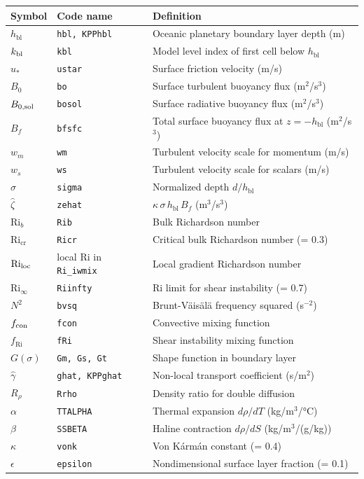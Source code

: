 \documentclass[12pt,letterpaper]{article}
\newcommand{\hbl}{h_{\mathrm{bl}}}
\newcommand{\ustar}{u_*}
\newcommand{\Ri}{\mathrm{Ri}}
\newcommand{\Ricr}{\mathrm{Ri_{cr}}}
\newcommand{\wm}{w_m}
\newcommand{\ws}{w_s}
\newcommand{\ghat}{\hat{\gamma}}
\newcommand{\bfsfc}{B_f}
\begin{document}
\begin{longtable}{llp{7cm}}  
\toprule  
\textbf{Symbol} & \textbf{Code name} & \textbf{Definition} \\  
\midrule  
\endhead  
$\hbl$ & \texttt{hbl, KPPhbl} & Oceanic planetary boundary layer depth (m) \\  
$k_{\rm bl}$ & \texttt{kbl} & Model level index of first cell below $\hbl$ \\  
$\ustar$ & \texttt{ustar} & Surface friction velocity (m/s) \\  
$B_0$ & \texttt{bo} & Surface turbulent buoyancy flux (m$^2$/s$^3$) \\  
$B_{0,\rm sol}$ & \texttt{bosol} & Surface radiative buoyancy flux (m$^2$/s$^3$) \\  
$\bfsfc$ & \texttt{bfsfc} & Total surface buoyancy flux at $z=-\hbl$ (m$^2$/s$^3$) \\  
$\wm$ & \texttt{wm} & Turbulent velocity scale for momentum (m/s) \\  
$\ws$ & \texttt{ws} & Turbulent velocity scale for scalars (m/s) \\  
$\sigma$ & \texttt{sigma} & Normalized depth $d/\hbl$ \\  
$\hat{\zeta}$ & \texttt{zehat} & $\kappa\,\sigma\,\hbl\,\bfsfc$ (m$^3$/s$^3$) \\  
$\Ri_b$ & \texttt{Rib} & Bulk Richardson number \\  
$\Ricr$ & \texttt{Ricr} & Critical bulk Richardson number (= 0.3) \\  
$\Ri_{\rm loc}$ & local Ri in \texttt{Ri\_iwmix} & Local gradient Richardson number \\  
$\Ri_\infty$ & \texttt{Riinfty} & Ri limit for shear instability (= 0.7) \\  
$N^2$ & \texttt{bvsq} & Brunt-V\"{a}is\"{a}l\"{a} frequency squared (s$^{-2}$) \\  
$f_{\rm con}$ & \texttt{fcon} & Convective mixing function \\  
$f_\Ri$ & \texttt{fRi} & Shear instability mixing function \\  
$G(\sigma)$ & \texttt{Gm, Gs, Gt} & Shape function in boundary layer \\  
$\ghat$ & \texttt{ghat, KPPghat} & Non-local transport coefficient (s/m$^2$) \\  
$R_\rho$ & \texttt{Rrho} & Density ratio for double diffusion \\  
$\alpha$ & \texttt{TTALPHA} & Thermal expansion $d\rho/dT$ (kg/m$^3$/°C) \\  
$\beta$ & \texttt{SSBETA} & Haline contraction $d\rho/dS$ (kg/m$^3$/(g/kg)) \\  
$\kappa$ & \texttt{vonk} & Von K\'{a}rm\'{a}n constant (= 0.4) \\  
$\epsilon$ & \texttt{epsilon} & Nondimensional surface layer fraction (= 0.1) \\  
\bottomrule  
\end{longtable}  
  
\end{document}
